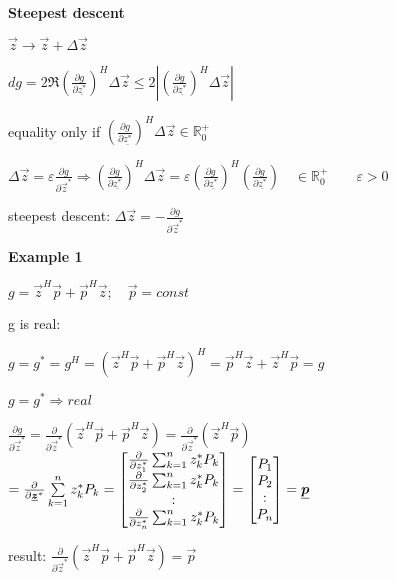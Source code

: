 \textbf{Steepest descent}

\begin{doublespace}


$\vec{z}\rightarrow\vec{z}+\Delta\vec{z}$

$dg=2\Re{\left(\frac{\partial g}{\partial \underline{z^*}}\right)^H\Delta\vec{z}} \leq2 \left|\left( \frac{\partial g}{\partial \underline{z^*}}\right)^H\Delta\vec{z} \right|$

equality only if $\left(\frac{\partial g}{\partial \underline{z^*}}\right)^H\Delta\vec{z}\in \mathbb{R}_0^+ $

$\Delta \vec{z}=\varepsilon \frac{\partial g}{\partial \vec{z}^*} \Rightarrow  \left(\frac{\partial g}{\partial \underline{z^*}}\right)^H\Delta\vec{z} = \varepsilon \left(\frac{\partial g}{\partial \underline{z^*}}\right)^H\left(\frac{\partial g}{\partial \underline{z^*}}\right)\quad \in \mathbb{R}_0^+ \qquad \varepsilon > 0$

steepest descent: $\Delta \vec{z}= -\frac{\partial g}{\partial \vec{z}^*}$
\end{doublespace}
\textbf{Example 1}

$g=\vec{z}^H\vec{p}+\vec{p}^H\vec{z}; \quad \vec{p}=const$

g is real:

$g=g^*=g^H=(\vec{z}^H\vec{p}+\vec{p}^H\vec{z})^H=\vec{p}^H\vec{z}+\vec{z}^H\vec{p}=g $

$ g=g^* \Rightarrow real$

$\frac{\partial g}{\partial \vec{z}^*}=\frac{\partial}{\partial \vec{z}^*}(\vec{z}^H\vec{p}+\vec{p}^H\vec{z})=\frac{\partial}{\partial \vec{z}^*}(\vec{z}^H\vec{p})$
$=\frac{\partial}{\partial \underline{\boldsymbol {z}}^*} \sum\limits_{k=1}^n z_k^* P_k =\begin{bmatrix}
\frac{\partial}{\partial z_1^*} \sum_{k=1}^n z_k^* P_k \\
\frac{\partial}{\partial z_2^*} \sum_{k=1}^n z_k^* P_k \\
:\\
\frac{\partial}{\partial z_n^*} \sum_{k=1}^n z_k^* P_k 
\end{bmatrix} =\begin{bmatrix}P_1\\P_2\\ :\\P_n\end{bmatrix} =\underline{\boldsymbol {p}}$

result:  $ \frac{\partial}{\partial \vec{z}^*}(\vec{z}^H\vec{p}+\vec{p}^H\vec{z}) = \vec{p} $

